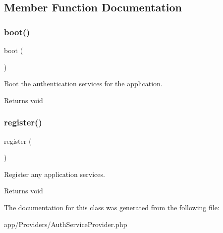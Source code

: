 \subsection{Member Function Documentation}
\mbox{\label{class_app_1_1_providers_1_1_auth_service_provider_a8814ea4b5beba763c570b4818980814e}} 
\subsubsection{\texorpdfstring{boot()}{boot()}}
{\footnotesize\ttfamily boot (\begin{DoxyParamCaption}{ }\end{DoxyParamCaption})}

Boot the authentication services for the application.

\begin{DoxyReturn}{Returns}
void 
\end{DoxyReturn}
\mbox{\label{class_app_1_1_providers_1_1_auth_service_provider_acc294a6cc8e69743746820e3d15e3f78}} 
\subsubsection{\texorpdfstring{register()}{register()}}
{\footnotesize\ttfamily register (\begin{DoxyParamCaption}{ }\end{DoxyParamCaption})}

Register any application services.

\begin{DoxyReturn}{Returns}
void 
\end{DoxyReturn}


The documentation for this class was generated from the following file\+:\begin{DoxyCompactItemize}
\item 
app/\+Providers/Auth\+Service\+Provider.\+php\end{DoxyCompactItemize}
